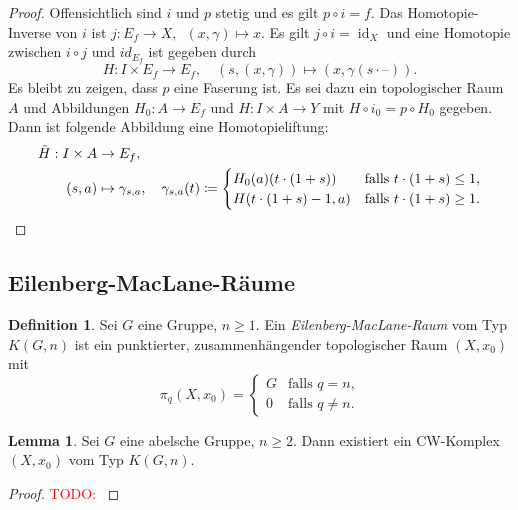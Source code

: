 \documentclass[11pt, a4paper, german]{article}
\theoremstyle{definition}
\newtheorem*{lem}{Lemma}
\newtheorem*{defn}{Definition}
\theoremstyle{remark}
\newcommand{\TODO}[1]{\textcolor{red}{TODO: #1}} %
\DeclareMathOperator{\id}{id} %
\newcommand{\blank}{\text{--}} %
\newcommand{\I}{I} %
\begin{document}
\begin{proof}
  Offensichtlich sind $i$ und $p$ stetig und es gilt $p \circ i = f$.
  Das Homotopie-Inverse von $i$ ist $j : E_f \to X, \enspace (x, \gamma) \mapsto x$.
  Es gilt $j \circ i = \id_X$ und eine Homotopie zwischen $i \circ j$ und $id_{E_f}$ ist gegeben durch
  \[
    H : \I \times E_f \to E_f, \quad
    (s, (x, \gamma)) \mapsto (x, \gamma(s \cdot \blank)).
  \]
  Es bleibt zu zeigen, dass $p$ eine Faserung ist.
  Es sei dazu ein topologischer Raum $A$ und Abbildungen $H_0 : A \to E_f$ und $H : \I \times A \to Y$ mit $H \circ i_0 = p \circ H_0$ gegeben.
  Dann ist folgende Abbildung eine Homotopieliftung:
  \begin{align*}
    \tilde{H} : \I \times A & \to E_f, \\
    (s, a) & \mapsto \gamma_{s, a}, \quad
    \gamma_{s, a}(t) \coloneqq \begin{cases}
      H_0(a)(t \cdot (1+s)) & \text{falls $t \cdot (1+s) \leq 1$,} \\
      H(t \cdot (1+s) - 1, a) & \text{falls $t \cdot (1+s) \geq 1$.}
      \qedhere
    \end{cases}
  \end{align*}
\end{proof}

\subsection{Eilenberg-MacLane-Räume}

\begin{defn}
  Sei $G$ eine Gruppe, $n \geq 1$.
  Ein \emph{Eilenberg-MacLane-Raum} vom Typ $K(G, n)$ ist ein punktierter, zusammenhängender topologischer Raum $(X, x_0)$ mit
  \[
    \pi_q(X, x_0) = \begin{cases}
      G & \text{falls $q = n$,} \\
      0 & \text{falls $q \neq n$.}
    \end{cases}
  \]
\end{defn}

\begin{lem}
  Sei $G$ eine abelsche Gruppe, $n \geq 2$.
  Dann existiert ein CW-Komplex $(X, x_0)$ vom Typ $K(G, n)$.
\end{lem}

\begin{proof}
  \TODO{}
\end{proof}
\end{document}
